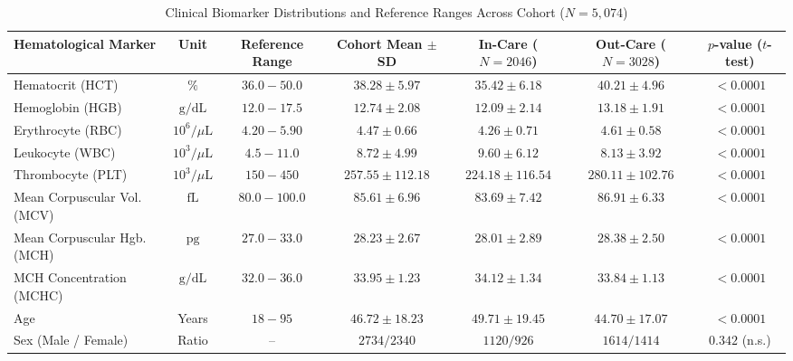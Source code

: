 \documentclass[conference]{IEEEtran}
\begin{document}
\begin{table}[t]
\centering
\caption{Clinical Biomarker Distributions and Reference Ranges Across Cohort ($N = 5,074$)}
\label{tab:dataset}
\begin{tabularx}{\textwidth}{l c c c c c c}
\toprule
\textbf{Hematological Marker} & \textbf{Unit} & \textbf{Reference Range} & \textbf{Cohort Mean $\pm$ SD} & \textbf{In-Care ($N=2046$)} & \textbf{Out-Care ($N=3028$)} & \textbf{$p$-value ($t$-test)} \\
\midrule
Hematocrit (HCT) & $\%$ & $36.0 - 50.0$ & $38.28 \pm 5.97$ & $35.42 \pm 6.18$ & $40.21 \pm 4.96$ & $< 0.0001$ \\
Hemoglobin (HGB) & $\text{g/dL}$ & $12.0 - 17.5$ & $12.74 \pm 2.08$ & $12.09 \pm 2.14$ & $13.18 \pm 1.91$ & $< 0.0001$ \\
Erythrocyte (RBC) & $10^6/\mu\text{L}$ & $4.20 - 5.90$ & $4.47 \pm 0.66$ & $4.26 \pm 0.71$ & $4.61 \pm 0.58$ & $< 0.0001$ \\
Leukocyte (WBC) & $10^3/\mu\text{L}$ & $4.5 - 11.0$ & $8.72 \pm 4.99$ & $9.60 \pm 6.12$ & $8.13 \pm 3.92$ & $< 0.0001$ \\
Thrombocyte (PLT) & $10^3/\mu\text{L}$ & $150 - 450$ & $257.55 \pm 112.18$ & $224.18 \pm 116.54$ & $280.11 \pm 102.76$ & $< 0.0001$ \\
Mean Corpuscular Vol. (MCV) & $\text{fL}$ & $80.0 - 100.0$ & $85.61 \pm 6.96$ & $83.69 \pm 7.42$ & $86.91 \pm 6.33$ & $< 0.0001$ \\
Mean Corpuscular Hgb. (MCH) & $\text{pg}$ & $27.0 - 33.0$ & $28.23 \pm 2.67$ & $28.01 \pm 2.89$ & $28.38 \pm 2.50$ & $< 0.0001$ \\
MCH Concentration (MCHC) & $\text{g/dL}$ & $32.0 - 36.0$ & $33.95 \pm 1.23$ & $34.12 \pm 1.34$ & $33.84 \pm 1.13$ & $< 0.0001$ \\
Age & Years & $18 - 95$ & $46.72 \pm 18.23$ & $49.71 \pm 19.45$ & $44.70 \pm 17.07$ & $< 0.0001$ \\
Sex (Male / Female) & Ratio & -- & $2734 / 2340$ & $1120 / 926$ & $1614 / 1414$ & $0.342$ (n.s.) \\
\bottomrule
\end{tabularx}
\end{table}
\end{document}
